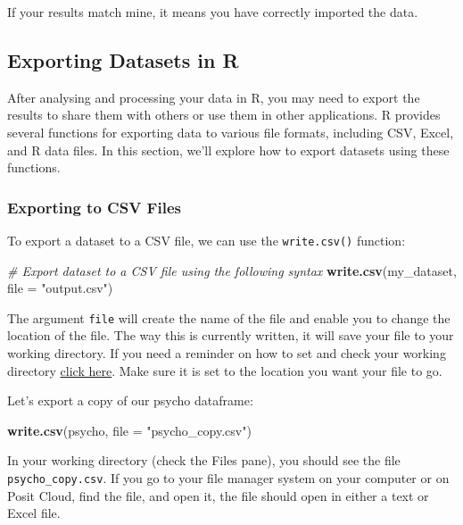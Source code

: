 \documentclass[
]{book}
\newenvironment{Shaded}{\begin{snugshade}}{\end{snugshade}}
\newcommand{\AttributeTok}[1]{\textcolor[rgb]{0.13,0.29,0.53}{#1}}
\newcommand{\CommentTok}[1]{\textcolor[rgb]{0.56,0.35,0.01}{\textit{#1}}}
\newcommand{\FunctionTok}[1]{\textcolor[rgb]{0.13,0.29,0.53}{\textbf{#1}}}
\newcommand{\NormalTok}[1]{#1}
\newcommand{\StringTok}[1]{\textcolor[rgb]{0.31,0.60,0.02}{#1}}
\begin{document}
If your results match mine, it means you have correctly imported the data.

\subsection{Exporting Datasets in R}\label{exporting-datasets-in-r}

After analysing and processing your data in R, you may need to export the results to share them with others or use them in other applications. R provides several functions for exporting data to various file formats, including CSV, Excel, and R data files. In this section, we'll explore how to export datasets using these functions.

\subsubsection{Exporting to CSV Files}\label{exporting-to-csv-files}

To export a dataset to a CSV file, we can use the \texttt{write.csv()} function:

\begin{Shaded}
\begin{Highlighting}[]
\CommentTok{\# Export dataset to a CSV file using the following syntax}
\FunctionTok{write.csv}\NormalTok{(my\_dataset, }\AttributeTok{file =} \StringTok{"output.csv"}\NormalTok{)}
\end{Highlighting}
\end{Shaded}

The argument \texttt{file} will create the name of the file and enable you to change the location of the file. The way this is currently written, it will save your file to your working directory. If you need a reminder on how to set and check your working directory \hyperref[set_wd]{click here}. Make sure it is set to the location you want your file to go.

Let's export a copy of our psycho dataframe:

\begin{Shaded}
\begin{Highlighting}[]
\FunctionTok{write.csv}\NormalTok{(psycho, }\AttributeTok{file =} \StringTok{"psycho\_copy.csv"}\NormalTok{)}
\end{Highlighting}
\end{Shaded}

In your working directory (check the Files pane), you should see the file \texttt{psycho\_copy.csv}. If you go to your file manager system on your computer or on Posit Cloud, find the file, and open it, the file should open in either a text or Excel file.
\end{document}
